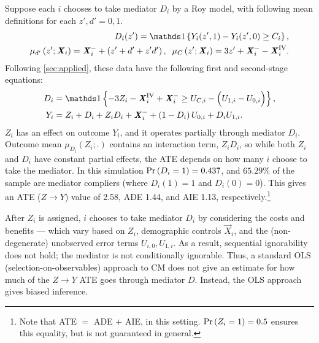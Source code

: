 Suppose each $i$ chooses to take mediator $D_i$ by a Roy model, with following mean definitions for each $z', d' = 0, 1$.
\begin{align*}
    D_i(z') = \indicator{Y_i(z', 1) - Y_i(z', 0) \geq C_i},  \\
    \mu_{d'}\left(z' ; \vec X_i \right) = \vec X_i^- + \left( z' + d' + z' d' \right),
    \;\; \mu_{C}\left(z' ; \vec X_i \right) = 3z' + \vec X_i^- - \vec X_i^{\text{IV}}.
\end{align*}
Following \autoref{sec:applied}, these data have the following first and second-stage equations:
\begin{align*}
    D_i &= \indicator{-3Z_i - \vec X_i^{\text{IV}} + \vec X_i^-
        \geq U_{C,i} - \Big( U_{1,i} - U_{0,i} \Big)},  \\
    Y_i &= Z_i + D_i + Z_i D_i + \vec X_i^-
        + \left( 1 - D_i \right) U_{0,i} + D_i U_{1,i}.
\end{align*}
$Z_i$ has an effect on outcome $Y_i$, and it operates partially through mediator $D_i$.
Outcome mean $\mu_{D_i}(Z_i;.)$ contains an interaction term, $Z_i D_i$, so while both $Z_i$ and $D_i$ have constant partial effects, the ATE depends on how many $i$ choose to take the mediator.
In this simulation $\Pr\left( D_i = 1 \right) = 0.437$, and $65.29\%$ of the sample are mediator compliers (where $D_i(1)=1$ and $D_i(0) = 0$).
This gives an ATE ($Z\to Y$) value of 2.58, ADE 1.44, and AIE 1.13, respectively.\footnote{
    Note that ATE $=$ ADE $+$ AIE, in this setting.
    $\Pr\left( Z_i=1 \right) = 0.5$ ensures this equality, but is not guaranteed in general.
}

After $Z_i$ is assigned, $i$ chooses to take mediator $D_i$ by considering the costs and benefits --- which vary based on $Z_i$, demographic controls $\vec X_i$, and the (non-degenerate) unobserved error terms $U_{i,0}, U_{1,i}$.
As a result, sequential ignorability does not hold; the mediator is not conditionally ignorable.
Thus, a standard OLS (selection-on-observables) approach to CM does not give an estimate for how much of the $Z \to Y$ ATE goes through mediator $D$.
Instead, the OLS approach gives biased inference.

